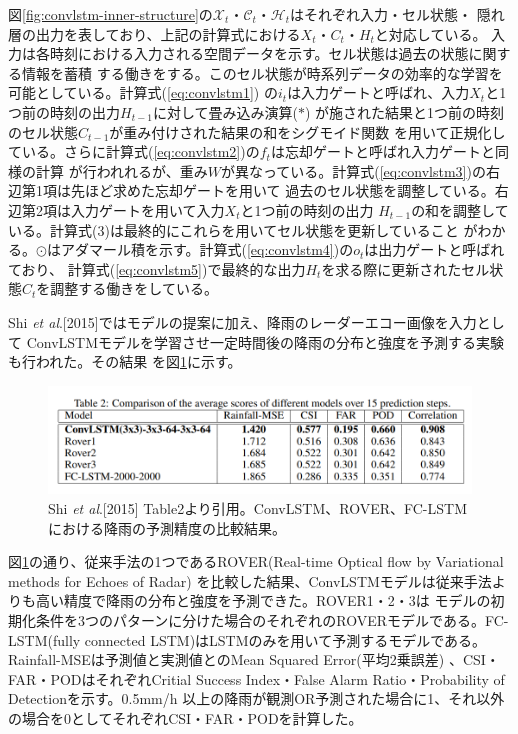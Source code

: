図\ref{fig:convlstm-inner-structure}の$\mathcal{X}_{t}$・$\mathcal{C}_{t}$・$\mathcal{H}_{t}$はそれぞれ入力・セル状態・
隠れ層の出力を表しており、上記の計算式における$X_{t}$・$C_{t}$・$H_{t}$と対応している。
入力は各時刻における入力される空間データを示す。セル状態は過去の状態に関する情報を蓄積
する働きをする。このセル状態が時系列データの効率的な学習を可能としている。計算式(\ref{eq:convlstm1})
の$i_{t}$は入力ゲートと呼ばれ、入力$X_{t}$と1つ前の時刻の出力$H_{t-1}$に対して畳み込み演算($*$)
が施された結果と1つ前の時刻のセル状態$C_{t-1}$が重み付けされた結果の和をシグモイド関数
を用いて正規化している。さらに計算式(\ref{eq:convlstm2})の$f_{t}$は忘却ゲートと呼ばれ入力ゲートと同様の計算
が行われれるが、重み$W$が異なっている。計算式(\ref{eq:convlstm3})の右辺第1項は先ほど求めた忘却ゲートを用いて
過去のセル状態を調整している。右辺第2項は入力ゲートを用いて入力$X_{t}$と1つ前の時刻の出力
$H_{t-1}$の和を調整している。計算式(3)は最終的にこれらを用いてセル状態を更新していること
がわかる。$\odot$はアダマール積を示す。計算式(\ref{eq:convlstm4})の$o_{t}$は出力ゲートと呼ばれており、
計算式(\ref{eq:convlstm5})で最終的な出力$H_{t}$を求る際に更新されたセル状態$C_{t}$を調整する働きをしている。

Shi \textit{et al}.[2015]ではモデルの提案に加え、降雨のレーダーエコー画像を入力として
ConvLSTMモデルを学習させ一定時間後の降雨の分布と強度を予測する実験も行われた。その結果
を図\ref{fig:shi-et-al-table2}に示す。

\begin{figure}[H]
\begin{center}
\includegraphics[width=0.9\linewidth]{fig/intro/shi-et-al-convlstm-mse-table.png}
\captionsetup{width=0.9\linewidth}
\caption{Shi \textit{et al}.[2015] Table2より引用。ConvLSTM、ROVER、FC-LSTMにおける降雨の予測精度の比較結果。}
\label{fig:shi-et-al-table2}
\end{center}
\end{figure}

図\ref{fig:shi-et-al-table2}の通り、従来手法の1つであるROVER(Real-time Optical flow by Variational methods for Echoes of Radar)
を比較した結果、ConvLSTMモデルは従来手法よりも高い精度で降雨の分布と強度を予測できた。ROVER1・2・3は
モデルの初期化条件を3つのパターンに分けた場合のそれぞれのROVERモデルである。FC-LSTM(fully connected 
LSTM)はLSTMのみを用いて予測するモデルである。Rainfall-MSEは予測値と実測値とのMean Squared Error(平均2乗誤差)
、CSI・FAR・PODはそれぞれCritial Success Index・False Alarm Ratio・Probability of Detectionを示す。0.5mm/h
以上の降雨が観測OR予測された場合に1、それ以外の場合を0としてそれぞれCSI・FAR・PODを計算した。

